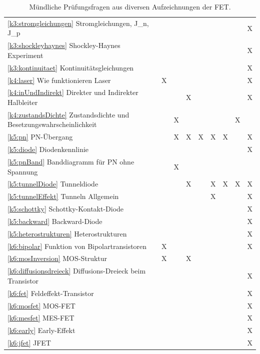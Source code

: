 \documentclass{article}
\begin{document}
\begin{center}
\begin{table}[H]
\begin{adjustbox}{width=\textwidth}
\begin{tabular}{lcccccccc}
\ref{k3:stromgleichungen} Stromgleichungen, J\_n, J\_p &&&&&&&& X \\
\ref{k3:shockleyhaynes} Shockley-Haynes Experiment &&&&&&&& X \\
\ref{k3:kontinuitaet} Kontinuit\"atsgleichungen &&&&&&&& X \\
\ref{k4:laser} Wie funktionieren Laser & X &&&&&&& X\\
\ref{k4:inUndIndirekt} Direkter und Indirekter Halbleiter&&& X &&&&& X \\
\ref{k4:zustandsDichte} Zustandsdichte und Besetzungswahrscheinlichkeit && X &&&&& X \\
\ref{k5:pn} PN-\"Ubergang && X & X & X &X&X&& X \\
\ref{k5:diode} Diodenkennlinie &&&&&&&& X \\
\ref{k5:pnBand} Banddiagramm f\"ur PN ohne Spannung  && X &&&&&& \\
\ref{k5:tunnelDiode} Tunneldiode&&& X && X & X & X & X \\
\ref{k5:tunnelEffekt} Tunneln Allgemein&&&&& X &&& X\\
\ref{k5:schottky} Schottky-Kontakt-Diode &&&&&&&& X \\
\ref{k5:backward} Backward-Diode &&&&&&&& X \\
\ref{k5:heterostrukturen} Heterostrukturen &&&&&&&& X \\
\ref{k6:bipolar} Funktion von Bipolartransistoren & X &&&&&&& X \\
\ref{k6:mosInversion} MOS-Struktur & X && X &&&&& \\
\ref{k6:diffusionsdreieck} Diffusions-Dreieck beim Transistor &&&&&&&& X \\
\ref{k6:fet} Feldeffekt-Transistor &&&&&&&& X \\
\ref{k6:mosfet} MOS-FET &&&&&&&& X \\
\ref{k6:mesfet} MES-FET &&&&&&&& X \\
\ref{k6:early} Early-Effekt &&&&&&&& X \\
\ref{k6:jfet} JFET &&&&&&&& X \\

\hline

\hline

\end{tabular}
\end{adjustbox}
\caption{Mündliche Prüfungsfragen aus diversen Aufzeichnungen der FET.}
\end{table}
\end{center}
\end{document}
